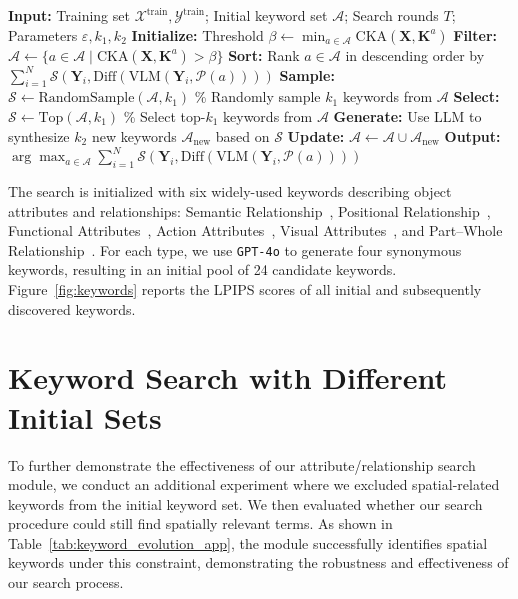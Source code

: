 \begin{algorithm}[ht]
   \caption{$\varepsilon$-Greedy Prompt Optimization}
   \label{alg:attr_opt}
\begin{algorithmic}
   \STATE \textbf{Input:} Training set $\mathcal{X}^{\text{train}}, \mathcal{Y}^{\text{train}}$; Initial keyword set $\mathcal{A}$; Search rounds $T$; Parameters $\varepsilon, k_1, k_2$
   \STATE \textbf{Initialize:} Threshold $\beta \leftarrow \min_{a \in \mathcal{A}} \text{CKA}\left(\mathbf{X}, \mathbf{K}^a\right)$
       \STATE \textbf{Filter:} $\mathcal{A} \leftarrow \{a \in \mathcal{A} \mid \text{CKA}\left(\mathbf{X}, \mathbf{K}^a\right) > \beta\}$
       \STATE \textbf{Sort:} Rank $a\in\mathcal{A}$ in descending order by $\sum_{i=1}^N\mathcal{S}\left(\mathbf{Y}_i,\text{Diff}(\text{VLM}(\mathbf{Y}_i,\mathcal{P}(a)))\right)$
           \STATE \textbf{Sample:} $\mathcal{S} \leftarrow \text{RandomSample}(\mathcal{A}, k_1)$ \hfill\% Randomly sample $k_1$ keywords from $\mathcal{A}$
       \ELSE
           \STATE \textbf{Select:} $\mathcal{S} \leftarrow \text{Top}(\mathcal{A}, k_1)$ \hfill\% Select top-$k_1$ keywords from $\mathcal{A}$
       \ENDIF
       \STATE \textbf{Generate:} Use LLM to synthesize $k_2$ new keywords $\mathcal{A}_{\text{new}}$ based on $\mathcal{S}$
       \STATE \textbf{Update:} $\mathcal{A} \leftarrow \mathcal{A} \cup \mathcal{A}_{\text{new}}$
   \ENDFOR
   \STATE \textbf{Output:} $\arg\max_{a \in \mathcal{A}} \sum_{i=1}^N\mathcal{S}\left(\mathbf{Y}_i,\text{Diff}(\text{VLM}(\mathbf{Y}_i,\mathcal{P}(a)))\right)$
\end{algorithmic}
\end{algorithm}

The search is initialized with six widely-used keywords describing object attributes and relationships: Semantic Relationship~\citep{johnson2015image}, Positional Relationship~\citep{lu2016visual,haldekar2017identifying}, Functional Attributes~\citep{zhu2015understanding}, Action Attributes~\citep{lu2016visual}, Visual Attributes~\citep{farhadi2009describing}, and Part–Whole Relationship~\citep{lu2016visual}. For each type, we use \texttt{GPT-4o} to generate four synonymous keywords, resulting in an initial pool of 24 candidate keywords. Figure~\ref{fig:keywords} reports the LPIPS scores of all initial and subsequently discovered keywords.

{\color{black}
\section{Keyword Search with Different Initial Sets}
\label{app:new_keyword_search}
To further demonstrate the effectiveness of our attribute/relationship search module, we conduct an additional experiment where we excluded spatial-related keywords from the initial keyword set. We then evaluated whether our search procedure could still find spatially relevant terms. As shown in Table~\ref{tab:keyword_evolution_app}, the module successfully identifies spatial keywords under this constraint, demonstrating the robustness and effectiveness of our search process.
}

